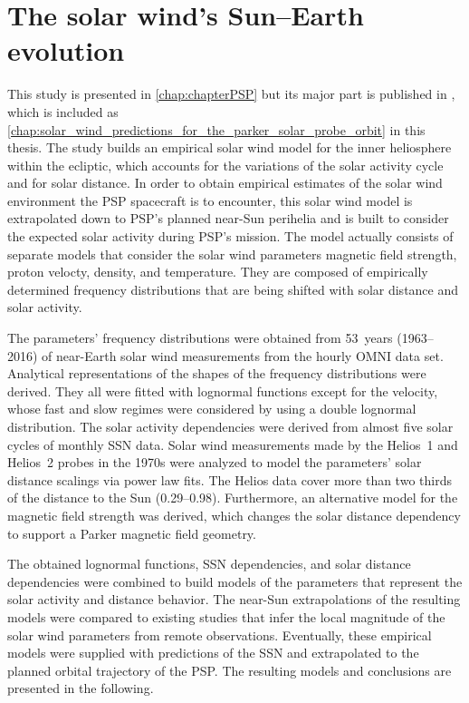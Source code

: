\section{The solar wind's Sun--Earth evolution}
This study is presented in \autoref{chap:chapterPSP} but its major part is published in \citet{Venzmer2018}, which is included as \autoref{chap:solar_wind_predictions_for_the_parker_solar_probe_orbit} in this thesis.
The study builds an empirical solar wind model for the inner heliosphere within the ecliptic, which accounts for the variations of the solar activity cycle and for solar distance. In order to obtain empirical estimates of the solar wind environment the PSP spacecraft is to encounter, this solar wind model is extrapolated down to PSP's planned near-Sun perihelia and is built to consider the expected solar activity during PSP's mission.
The model actually consists of separate models that consider the solar wind parameters magnetic field strength, proton velocty, density, and temperature. They are composed of empirically determined frequency distributions that are being shifted with solar distance and solar activity.

The parameters' frequency distributions were obtained from 53~years (1963--2016) of near-Earth solar wind measurements from the hourly OMNI data set. Analytical representations of the shapes of the frequency distributions were derived. They all were fitted with lognormal functions except for the velocity, whose fast and slow regimes were considered by using a double lognormal distribution. The solar activity dependencies were derived from almost five solar cycles of monthly SSN data. Solar wind measurements made by the Helios~1 and Helios~2 probes in the 1970s were analyzed to model the parameters' solar distance scalings via power law fits. The Helios data cover more than two thirds of the distance to the Sun (\SIrange{0.29}{0.98}{\au}). Furthermore, an alternative model for the magnetic field strength was derived, which changes the solar distance dependency to support a Parker magnetic field geometry.

The obtained lognormal functions, SSN dependencies, and solar distance dependencies were combined to build models of the parameters that represent the solar activity and distance behavior. The near-Sun extrapolations of the resulting models were compared to existing studies that infer the local magnitude of the solar wind parameters from remote observations. Eventually, these empirical models were supplied with predictions of the SSN and extrapolated to the planned orbital trajectory of the PSP. The resulting models and conclusions are presented in the following.

